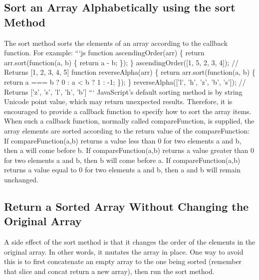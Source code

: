 \documentclass{article}%
\begin{document}
\subsection{Sort an Array Alphabetically using the sort Method}%
\label{subsec:SortanArrayAlphabeticallyusingthesortMethod}%
The sort method sorts the elements of an array according to the callback function.\newline%
For example:\newline%
```js\newline%
function ascendingOrder(arr) \{\newline%
  return arr.sort(function(a, b) \{\newline%
    return a {-} b;\newline%
  \});\newline%
\}\newline%
ascendingOrder({[}1, 5, 2, 3, 4{]});\newline%
// Returns {[}1, 2, 3, 4, 5{]}\newline%
function reverseAlpha(arr) \{\newline%
  return arr.sort(function(a, b) \{\newline%
    return a === b ? 0 : a < b ? 1 : {-}1;\newline%
  \});\newline%
\}\newline%
reverseAlpha({[}'l', 'h', 'z', 'b', 's'{]});\newline%
// Returns {[}'z', 's', 'l', 'h', 'b'{]}\newline%
```\newline%
JavaScript's default sorting method is by string Unicode point value, which may return unexpected results. Therefore, it is encouraged to provide a callback function to specify how to sort the array items. When such a callback function, normally called compareFunction, is supplied, the array elements are sorted according to the return value of the compareFunction:\newline%
If compareFunction(a,b) returns a value less than 0 for two elements a and b, then a will come before b.\newline%
If compareFunction(a,b) returns a value greater than 0 for two elements a and b, then b will come before a.\newline%
If compareFunction(a,b) returns a value equal to 0 for two elements a and b, then a and b will remain unchanged.\newline%

%
\subsection{Return a Sorted Array Without Changing the Original Array}%
\label{subsec:ReturnaSortedArrayWithoutChangingtheOriginalArray}%
A side effect of the sort method is that it changes the order of the elements in the original array. In other words, it mutates the array in place. One way to avoid this is to first concatenate an empty array to the one being sorted (remember that slice and concat return a new array), then run the sort method.\newline%
\end{document}
